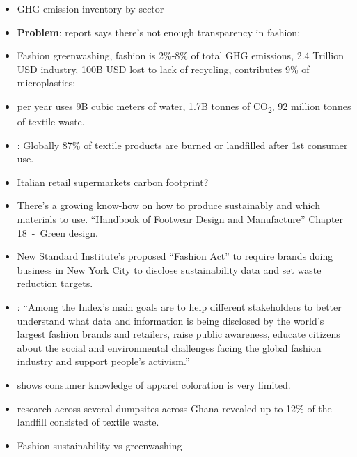 \documentclass[
  letterpaper,
  DIV=11,
  numbers=noendperiod]{scrartcl}
\begin{document}
\begin{itemize}
\item
  \citep{hannahritchieSectorSectorWhere2020, usepaGlobalGreenhouseGas2016}
  GHG emission inventory by sector
\item
  \textbf{Problem}: \citet{emilychanWeStillDon2022} report says there's
  not enough transparency in fashion:
\item
  Fashion greenwashing, fashion is 2\%-8\% of total GHG emissions, 2.4
  Trillion USD industry, 100B USD lost to lack of recycling, contributes
  9\% of microplastics:
  \citet{adamkiewiczGreenwashingSustainableFashion2022}
\item
  \citet{centobelliSlowingFastFashion2022} per year uses 9B cubic meters
  of water, 1.7B tonnes of CO\textsubscript{2}, 92 million tonnes of
  textile waste.
\item
  \citet{kohlerCircularEconomyPerspectives2021}: Globally 87\% of
  textile products are burned or landfilled after 1st consumer use.
\item
  \citet{marrucciImprovingCarbonFootprint2020} Italian retail
  supermarkets carbon footprint?
\item
  \citet{leungGreenDesign2021} There's a growing know-how on how to
  produce sustainably and which materials to use. ``Handbook of Footwear
  Design and Manufacture'' Chapter 18~-~Green design.
\item
  \citet{emilychanWill2022Be2022} New Standard Institute's proposed
  ``Fashion Act'' to require brands doing business in New York City to
  disclose sustainability data and set waste reduction targets.
\item
  \citet{wikirateSharingDataCreating2022}: ``Among the Index's main
  goals are to help different stakeholders to better understand what
  data and information is being disclosed by the world's largest fashion
  brands and retailers, raise public awareness, educate citizens about
  the social and environmental challenges facing the global fashion
  industry and support people's activism.''
\item
  \citet{mabuzaNaturalSyntheticDyes2023} shows consumer knowledge of
  apparel coloration is very limited.
\item
  \citet{gyabaahCharacterizationDumpsiteWaste2023} research across
  several dumpsites across Ghana revealed up to 12\% of the landfill
  consisted of textile waste.
\item
  \citet{imperfectidealistSustainableGreenwashingHow2020} Fashion
  sustainability vs greenwashing

\end{itemize}
\end{document}

